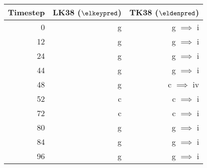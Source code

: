 \begin{tabular}{r|rr}
Timestep       & LK38 ($\elkeypred$) & TK38 ($\eldenpred$)  \\ \hline
0              & g                   & g $\implies$ i       \\
12             & g                   & g $\implies$ i       \\
24             & g                   & g $\implies$ i       \\
44             & g                   & g $\implies$ i       \\ \hline
48             & g                   & c $\implies$ iv      \\
52             & c                   & c $\implies$ i       \\
72             & c                   & c $\implies$ i       \\
80             & g                   & g $\implies$ i       \\
84             & g                   & g $\implies$ i       \\
96             & g                   & g $\implies$ i       \\
\end{tabular}
